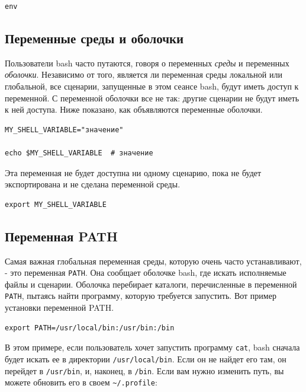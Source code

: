 \documentclass[12pt]{article}
\begin{document}
\begin{verbatim}
env
\end{verbatim}

\hypertarget{Shell-Variables}{%
\subsection{\texorpdfstring{\protect\hyperlink{Shell-Variables}{}Переменные
среды и оболочки}{Переменные среды и оболочки}}\label{Shell-Variables}}

Пользователи bash часто путаются, говоря о переменных \emph{среды} и
переменных \emph{оболочки}. Независимо от того, является ли переменная
среды локальной или глобальной, все сценарии, запущенные в этом сеансе
bash, будут иметь доступ к переменной. С переменной оболочки все не так:
другие сценарии не будут иметь к ней доступа. Ниже показано, как
объявляются переменные оболочки.

\begin{verbatim}
MY_SHELL_VARIABLE="значение"

echo $MY_SHELL_VARIABLE  # значение
\end{verbatim}

Эта переменная не будет доступна ни одному сценарию, пока не будет
экспортирована и не сделана переменной среды.

\begin{verbatim}
export MY_SHELL_VARIABLE
\end{verbatim}

\hypertarget{PATH-variable}{%
\subsection{\texorpdfstring{\protect\hyperlink{PATH-variable}{}Переменная
PATH}{Переменная PATH}}\label{PATH-variable}}

Самая важная глобальная переменная среды, которую очень часто
устанавливают, - это переменная \texttt{PATH}. Она сообщает оболочке
bash, где искать исполняемые файлы и сценарии. Оболочка перебирает
каталоги, перечисленные в переменной \texttt{PATH}, пытаясь найти
программу, которую требуется запустить. Вот пример установки переменной
PATH.

\begin{verbatim}
export PATH=/usr/local/bin:/usr/bin:/bin
\end{verbatim}

В этом примере, если пользователь хочет запустить программу
\texttt{cat}, bash сначала будет искать ее в директории
\texttt{/usr/local/bin}. Если он не найдет его там, он перейдет в
\texttt{/usr/bin}, и, наконец, в \texttt{/bin}. Если вам нужно изменить
путь, вы можете обновить его в своем
\texttt{\textasciitilde{}/.profile}:
\end{document}
